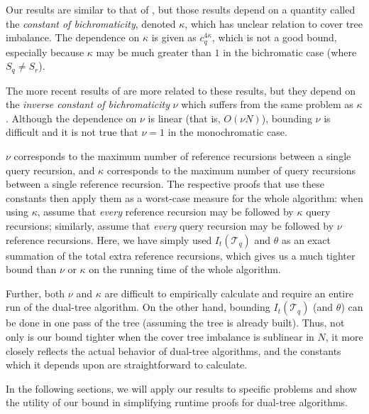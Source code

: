 Our results are similar to that of \citet{ram2009}, but those results depend on
a quantity called the {\it constant of bichromaticity}, denoted $\kappa$, which
has unclear relation to cover tree imbalance.  The dependence on $\kappa$ is
given as $c_q^{4 \kappa}$, which is not a good bound, especially because
$\kappa$ may be much greater than $1$ in the bichromatic case (where $S_q \ne
S_r$).

The more recent results of \citet{curtin2014dual} are more related to these
results, but they depend on the {\it inverse constant of bichromaticity} $\nu$
which suffers from the same problem as $\kappa$.  Although the dependence on
$\nu$ is linear (that is, $O(\nu N)$), bounding $\nu$ is difficult and it is not
true that $\nu = 1$ in the monochromatic case.

$\nu$ corresponds to the maximum number of reference recursions between a single
query recursion, and $\kappa$ corresponds to the maximum number of query
recursions between a single reference recursion.  The respective proofs that use
these constants then apply them as a worst-case measure for the whole algorithm:
when using $\kappa$, \citet{ram2009} assume that {\it every} reference recursion
may be followed by $\kappa$ query recursions; similarly, \citet{curtin2014dual}
assume that {\it every} query recursion may be followed by $\nu$ reference
recursions.  Here, we have simply used $I_t(\mathscr{T}_q)$ and $\theta$ as an
exact summation of the total extra reference recursions, which gives us a much
tighter bound than $\nu$ or $\kappa$ on the running time of the whole algorithm.

Further, both $\nu$ and $\kappa$ are difficult to empirically calculate and
require an entire run of the dual-tree algorithm.  On the other hand, bounding
$I_t(\mathscr{T}_q)$ (and $\theta$) can be done in one pass of the tree
(assuming the tree is already built).  Thus, not only is our bound tighter when
the cover tree imbalance is sublinear in $N$, it more closely reflects the
actual behavior of dual-tree algorithms, and the constants which it depends upon
are straightforward to calculate.

In the following sections, we will apply our results to specific problems and
show the utility of our bound in simplifying runtime proofs for dual-tree
algorithms.



